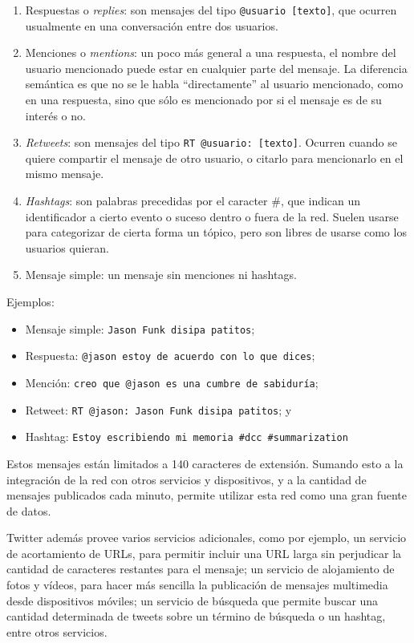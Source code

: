 \begin{enumerate}
\item Respuestas o \emph{replies}: son mensajes del tipo \texttt{@usuario [texto]},
      que ocurren usualmente en una conversación entre dos usuarios.
\item Menciones o \emph{mentions}: un poco más general a una respuesta, el
      nombre del usuario mencionado puede estar en cualquier parte del
      mensaje. La diferencia semántica es que no se le habla
      ``directamente'' al usuario mencionado, como en una respuesta, sino
      que sólo es mencionado por si el mensaje es de su interés o no.
\item \emph{Retweets}: son mensajes del tipo \texttt{RT @usuario: [texto]}. Ocurren
      cuando se quiere compartir el mensaje de otro usuario, o citarlo
      para mencionarlo en el mismo mensaje.
\item \emph{Hashtags}: son palabras precedidas por el caracter \#, que indican
      un identificador a cierto evento o suceso dentro o fuera de la
      red. Suelen usarse para categorizar de cierta forma un tópico, pero
      son libres de usarse como los usuarios quieran.
\item Mensaje simple: un mensaje sin menciones ni hashtags.
\end{enumerate}
  Ejemplos:

\begin{itemize}
\item Mensaje simple: \texttt{Jason Funk disipa patitos};
\item Respuesta: \texttt{@jason estoy de acuerdo con lo que dices};
\item Mención: \texttt{creo que @jason es una cumbre de sabiduría};
\item Retweet: \texttt{RT @jason: Jason Funk disipa patitos}; y
\item Hashtag: \texttt{Estoy escribiendo mi memoria \#dcc \#summarization}
\end{itemize}
  Estos mensajes están limitados a 140 caracteres de extensión. Sumando
  esto a la integración de la red con otros servicios y dispositivos, y
  a la cantidad de mensajes publicados cada minuto, permite utilizar
  esta red como una gran fuente de datos.

  Twitter además provee varios servicios adicionales, como por ejemplo,
  un servicio de acortamiento de URLs, para permitir incluir una URL
  larga sin perjudicar la cantidad de caracteres restantes para el
  mensaje; un servicio de alojamiento de fotos y vídeos, para hacer más
  sencilla la publicación de mensajes multimedia desde dispositivos
  móviles; un servicio de búsqueda que permite buscar una cantidad
  determinada de tweets sobre un término de búsqueda o un hashtag,
  entre otros servicios.







